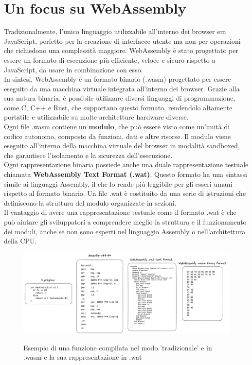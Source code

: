 \clearpage

\section{Un focus su WebAssembly}
\label{sec:webassembly}
Tradizionalmente, l'unico linguaggio utilizzabile all'interno dei browser era JavaScript, perfetto per la creazione di interfacce utente ma non per operazioni che richiedono una complessità maggiore. WebAssembly è stato progettato per essere un formato di esecuzione più efficiente, veloce e sicuro rispetto a JavaScript, da usare in combinazione con esso.
\\
In sintesi, WebAssembly è un formato binario (.wasm) progettato per essere eseguito da una macchina virtuale integrata all'interno dei browser. Grazie alla sua natura binaria, è possibile utilizzare diversi linguaggi di programmazione, come C, C++ e Rust, che supportano questo formato, rendendolo altamente portatile e utilizzabile su molte architetture hardware diverse.
\\
Ogni file .wasm contiene un \textbf{modulo}, che può essere visto come un'unità di codice autonomo, composto da funzioni, dati e altre risorse. Il modulo viene eseguito all'interno della macchina virtuale del browser in modalità sandboxed, che garantisce l'isolamento e la sicurezza dell'esecuzione.
\\
Ogni rappresentazione binaria possiede anche una duale rappresentazione testuale chiamata \textbf{WebAssembly Text Format (.wat)}. Questo formato ha una sintassi simile ai linguaggi Assembly, il che lo rende più leggibile per gli esseri umani rispetto al formato binario. Un file .wat è costituito da una serie di istruzioni che definiscono la struttura del modulo organizzate in sezioni.
\\
Il vantaggio di avere una rappresentazione testuale come il formato .wat è che può aiutare gli sviluppatori a comprendere meglio la struttura e il funzionamento dei moduli, anche se non sono esperti nel linguaggio Assembly o nell'architettura della CPU.

\begin{figure}[h]
    \centering
    \captionsetup{justification=centering}
    \includegraphics[width=15cm]{./images/3.source_code_wat_wasm.png}
    \label{source_code_wat_wasm}
    \caption{Esempio di una funzione compilata nel modo 'tradizionale' e in .wasm e la sua rappresentazione in .wat}
\end{figure}

